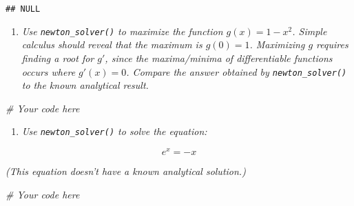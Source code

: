 \documentclass[
]{article}
\newenvironment{Shaded}{\begin{snugshade}}{\end{snugshade}}
\newcommand{\CommentTok}[1]{\textcolor[rgb]{0.56,0.35,0.01}{\textit{#1}}}
\providecommand{\tightlist}{%
  \setlength{\itemsep}{0pt}\setlength{\parskip}{0pt}}
\begin{document}
\begin{verbatim}
## NULL
\end{verbatim}

\begin{enumerate}
\def\labelenumi{\arabic{enumi}.}
\setcounter{enumi}{1}
\tightlist
\item
  \emph{Use \texttt{newton\_solver()} to maximize the function
  \(g(x) = 1 - x^2\). Simple calculus should reveal that the maximum is
  \(g(0) = 1\). Maximizing \(g\) requires finding a root for \(g'\),
  since the maxima/minima of differentiable functions occurs where
  \(g'(x) = 0\). Compare the answer obtained by
  \texttt{newton\_solver()} to the known analytical result.}
\end{enumerate}

\begin{Shaded}
\begin{Highlighting}[]
\CommentTok{\# Your code here}
\end{Highlighting}
\end{Shaded}

\begin{enumerate}
\def\labelenumi{\arabic{enumi}.}
\setcounter{enumi}{2}
\tightlist
\item
  \emph{Use \texttt{newton\_solver()} to solve the equation:}
\end{enumerate}

\[e^x = -x\]

\emph{(This equation doesn't have a known analytical solution.)}

\begin{Shaded}
\begin{Highlighting}[]
\CommentTok{\# Your code here}
\end{Highlighting}
\end{Shaded}
\end{document}
